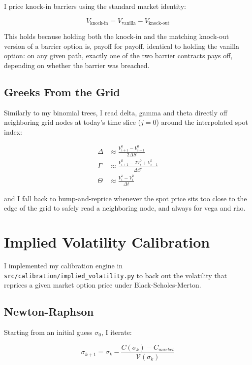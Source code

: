 \documentclass[12pt,a4paper]{article}
\begin{document}
I price knock-in barriers using the standard market identity:

\begin{equation}
V_{\text{knock-in}} = V_{\text{vanilla}} - V_{\text{knock-out}}
\end{equation}

This holds because holding both the knock-in and the matching knock-out
version of a barrier option is, payoff for payoff, identical to holding
the vanilla option: on any given path, exactly one of the two barrier
contracts pays off, depending on whether the barrier was breached.

\subsection{Greeks From the Grid}

Similarly to my binomial trees, I read delta, gamma and theta directly off
neighboring grid nodes at today's time slice ($j=0$) around the
interpolated spot index:

\begin{align}
\Delta &\approx \frac{V_{i+1}^0 - V_{i-1}^0}{2\Delta S} \\
\Gamma &\approx \frac{V_{i+1}^0 - 2V_i^0 + V_{i-1}^0}{\Delta S^2} \\
\Theta &\approx \frac{V_i^1 - V_i^0}{\Delta t}
\end{align}

and I fall back to bump-and-reprice whenever the spot price sits too close
to the edge of the grid to safely read a neighboring node, and always for
vega and rho.

\section{Implied Volatility Calibration}

I implemented my calibration engine in
\texttt{src/calibration/implied\_volatility.py} to back out the volatility
that reprices a given market option price under Black-Scholes-Merton.

\subsection{Newton-Raphson}

Starting from an initial guess $\sigma_0$, I iterate:

\begin{equation}
\sigma_{k+1} = \sigma_k - \frac{C(\sigma_k) - C_{market}}{\mathcal{V}(\sigma_k)}
\end{equation}
\end{document}
